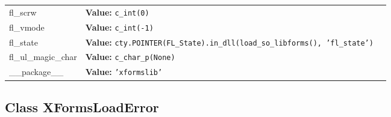 \begin{longtable}{|p{\varnamewidth}|p{\vardescrwidth}|l}
\cline{1-2}
\raggedright f\-l\-\_\-s\-c\-r\-w\- & \raggedright \textbf{Value:} 
{\tt c\_int(0)}&\\
\cline{1-2}
\raggedright f\-l\-\_\-v\-m\-o\-d\-e\- & \raggedright \textbf{Value:} 
{\tt c\_int(-1)}&\\
\cline{1-2}
\raggedright f\-l\-\_\-s\-t\-a\-t\-e\- & \raggedright \textbf{Value:} 
{\tt cty.POINTER(FL\_State).in\_dll(load\_so\_libforms(), 'fl\_state')}&\\
\cline{1-2}
\raggedright f\-l\-\_\-u\-l\-\_\-m\-a\-g\-i\-c\-\_\-c\-h\-a\-r\- & \raggedright \textbf{Value:} 
{\tt c\_char\_p(None)}&\\
\cline{1-2}
\raggedright \_\-\_\-p\-a\-c\-k\-a\-g\-e\-\_\-\_\- & \raggedright \textbf{Value:} 
{\tt \texttt{'}\texttt{xformslib}\texttt{'}}&\\
\cline{1-2}
\end{longtable}



\subsection{Class XFormsLoadError}

